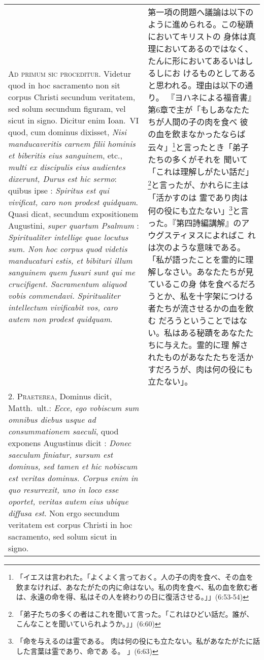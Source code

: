 \documentclass[10pt]{jsarticle} %
\begin{document}
\begin{longtable}{p{21em}p{21em}}

{\scshape Ad primum sic proceditur}. Videtur quod in hoc sacramento non sit
 corpus Christi secundum veritatem, sed solum secundum figuram, vel
 sicut in signo. Dicitur enim Ioan.~{\scshape VI} quod, cum dominus dixisset,
 {\itshape Nisi manducaveritis carnem filii hominis et biberitis eius sanguinem},
 etc., {\itshape multi ex discipulis eius audientes dixerunt, Durus est hic
 sermo}:  quibus ipse : {\itshape Spiritus est qui vivificat, caro non prodest
 quidquam}. Quasi dicat, secundum expositionem Augustini, {\itshape super quartum
 Psalmum} : {\itshape Spiritualiter intellige quae locutus sum. Non hoc corpus
 quod videtis manducaturi estis, et bibituri illum sanguinem quem
 fusuri sunt qui me crucifigent. Sacramentum aliquod vobis
 commendavi. Spiritualiter intellectum vivificabit vos, caro autem non
 prodest quidquam}.



&

第一項の問題へ議論は以下のように進められる。この秘蹟においてキリストの
 身体は真理においてあるのではなく、たんに形においてあるいはしるしにお
 けるものとしてあると思われる。理由は以下の通り。
『ヨハネによる福音書』第6章で主が「もしあなたたちが人間の子の肉を食べ
 彼の血を飲まなかったならば云々」\footnote{「イエスは言われた。「よくよく言っておく。人の子の肉を食べ、その血を飲まなければ、あなたがたの内に命はない。私の肉を食べ、私の血を飲む者は、永遠の命を得、私はその人を終わりの日に復活させる。」」(6:53-54)}と言ったとき「弟子たちの多くがそれを
 聞いて「これは理解しがたい話だ」\footnote{「弟子たちの多くの者はこれを聞いて言った。「これはひどい話だ。誰が、こんなことを聞いていられようか。」」(6:60)}と言ったが、かれらに主は「活かすのは
 霊であり肉は何の役にも立たない」\footnote{「命を与えるのは霊である。
 肉は何の役にも立たない。私があなたがたに話した言葉は霊であり、命であ
 る。 」(6:63)}と言った。『第四詩編講解』のアウグスティヌスによればこ
 れは次のような意味である。「私が語ったことを霊的に理解しなさい。あなたたちが見ているこの身
 体を食べるだろうとか、私を十字架につける者たちが流させるかの血を飲む
 だろうということではない。私はある秘蹟をあなたたちに与えた。霊的に理
 解されたものがあなたたちを活かすだろうが、肉は何の役にも立たない」。



\\



2. {\scshape Praeterea}, Dominus dicit, Matth.~ult.: {\itshape Ecce, ego
 vobiscum sum omnibus diebus usque ad consummationem saeculi}, quod
 exponens Augustinus dicit :  {\itshape Donec saeculum finiatur,
 sursum est dominus, sed tamen et hic nobiscum est veritas
 dominus. Corpus enim in quo resurrexit, uno in loco esse oportet,
 veritas autem eius ubique diffusa est}. Non ergo secundum veritatem
 est corpus Christi in hoc sacramento, sed solum sicut in signo.



\end{longtable}
\end{document}
